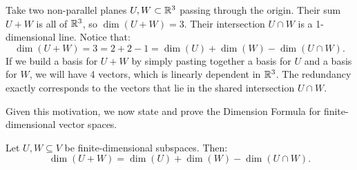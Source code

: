 \documentclass[../linear_algebra_and_groups.tex]{subfiles}
\begin{document}
\begin{example}
    Take two non-parallel planes $U,W\subset\mathbb{R}^3$ passing through the origin. Their sum $U+W$ is all of $\mathbb{R}^3$, so $\dim(U+W)=3$. Their intersection $U\cap W$ is a 1-dimensional line. Notice that:
    \[ \dim(U+W) = 3 = 2 + 2 - 1 = \dim(U) + \dim(W) - \dim(U\cap W). \]
    If we build a basis for $U+W$ by simply pasting together a basis for $U$ and a basis for $W$, we will have 4 vectors, which is linearly dependent in $\mathbb{R}^3$. The redundancy exactly corresponds to the vectors that lie in the shared intersection $U \cap W$.
\end{example}
Given this motivation, we now state and prove the Dimension Formula for finite-dimensional vector spaces.
\begin{theorem}
\label{thm:dimensionformula}
    \begin{shaded*}
        Let $U,W\subseteq V$ be finite-dimensional subspaces. Then:
        \[ \dim(U+W) = \dim(U) + \dim(W) - \dim(U\cap W). \]
    \end{shaded*}
\end{theorem}
\end{document}
